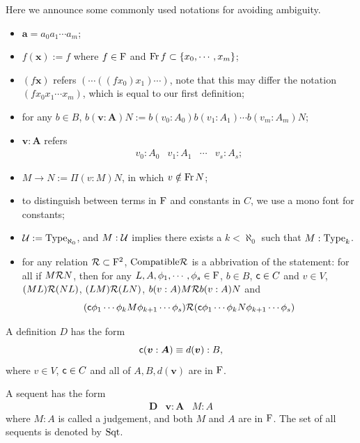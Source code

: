 \begin{notation}
  Here we announce some commonly used notations for avoiding ambiguity.
  \begin{itemize}
    \item $\bm a = a_0 a_1 \cdots a_m$;
    \item $f(\bm x) := f$ where $f \in \mathrm{F}$ and $\operatorname{Fr} f \subset \{x_0, \cdots, x_m\}$;
    \item $(f \bm x)$ refers $ (\cdots ((f x_0) x_1) \cdots ) $, note that this may differ the notation $ (f x_0 x_1 \cdots x_m)$, which is equal to our first definition;
    \item for any $b \in B$, $b(\bm v : \bm A)N := b(v_0 : A_0)b(v_1 : A_1) \cdots b(v_m : A_m)N$;
    \item $\bm v : \bm A$ refers 
      \[
        \begin{array}{llll}
          v_0 : A_0  & v_1 : A_1 & \cdots & v_s : A_s;
        \end{array}
      \]
    \item $M \rightarrow N := \Pi(v : M)N$, in which $v \notin \operatorname{Fr} N$;
    \item to distinguish between terms in $\mathrm{F}$ and constants in $C$, we use a mono font for constants;
    \item $\mathcal{U} := \mathrm{Type}_{\aleph_0}$, and $M : \mathcal{U}$ implies there exists a $k < \aleph_0$ such that $M : \mathrm{Type}_k$.
    \item for any relation $\mathcal{R} \subset \mathrm{F}^2$, $\mathrm{Compatible} \mathcal{R}$ is a abbrivation of the statement: for all if $M \mathcal{R} N$, then for any $L, A, \phi_1, \cdots, \phi_s \in \mathrm{F}$, $b \in B$, $\text{{\sffamily c}} \in C$ and $v \in V$, $(ML) \mathcal{R} (NL)$, $(LM) \mathcal{R} (LN)$, $b(v : A)M \mathcal{R} b(v : A)N$ and 
    \[
      (\text{{\sffamily c}} \phi_1 \cdots \phi_k M \phi_{k+1} \cdots \phi_s) \mathcal{R} (\text{{\sffamily c}} \phi_1 \cdots \phi_k N \phi_{k+1} \cdots \phi_s)
    \]
  \end{itemize}
\end{notation}



\begin{definition}
  A definition $D$ has the form 
  \[
    \text{{\sffamily c}} (\boldsymbol{v} : \boldsymbol{A}) \equiv d (\boldsymbol{v}) : B,
  \]
  where $v \in V$, $\text{{\sffamily c}} \in C$ and all of $A, B, d(\bm v)$ are in $\mathrm{F}$.
\end{definition}



\begin{definition}
  A sequent has the form
  \[
    \begin{array}{lll}
      \bm D  &  \bm v : \bm A  &  M : A
    \end{array}
  \]
  where $M : A$ is called a judgement, and both $M$ and $A$ are in $\mathrm{F}$. The set of all sequents is denoted by $\mathrm{Sqt}$.
\end{definition}




